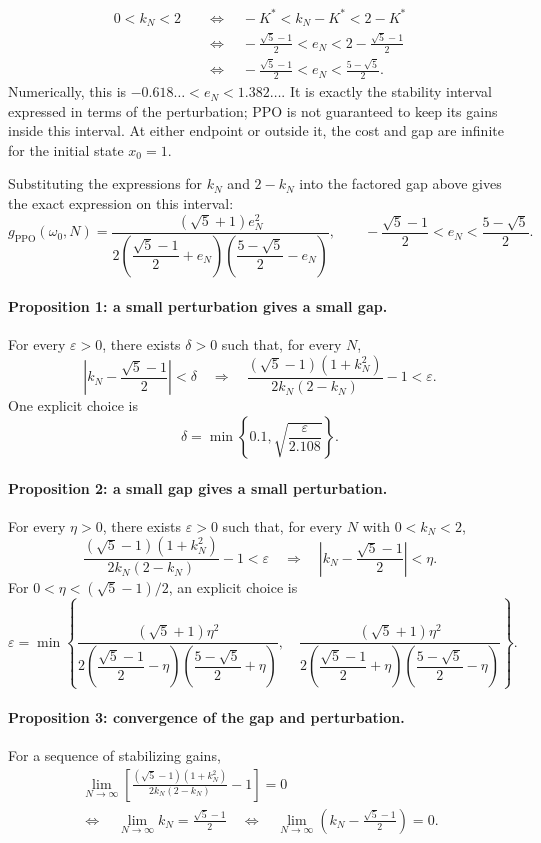 \documentclass[11pt]{article}
\begin{document}
\begin{align*}
  0<k_N<2
  &\quad\Longleftrightarrow\quad -K^*<k_N-K^*<2-K^* \\
  &\quad\Longleftrightarrow\quad
    -\frac{\sqrt{5}-1}{2}<e_N<2-\frac{\sqrt{5}-1}{2} \\
  &\quad\Longleftrightarrow\quad
    -\frac{\sqrt{5}-1}{2}<e_N<\frac{5-\sqrt{5}}{2}.
\end{align*}
Numerically, this is $-0.618\ldots<e_N<1.382\ldots$. It is exactly the stability
interval expressed in terms of the perturbation; PPO is not guaranteed to keep
its gains inside this interval. At either endpoint or outside it, the cost and
gap are infinite for the initial state $x_0=1$.

Substituting the expressions for $k_N$ and $2-k_N$ into the factored gap above
gives the exact expression on this interval:
\[
  g_{\mathrm{PPO}}(\omega_0,N)
  = \frac{(\sqrt{5}+1)e_N^2}
    {2\left(\dfrac{\sqrt{5}-1}{2}+e_N\right)
       \left(\dfrac{5-\sqrt{5}}{2}-e_N\right)},
  \qquad
  -\frac{\sqrt{5}-1}{2}<e_N<\frac{5-\sqrt{5}}{2}.
\]

\paragraph{Proposition 1: a small perturbation gives a small gap.}
For every $\varepsilon>0$, there exists $\delta>0$ such that, for every $N$,
\[
  \left|k_N-\frac{\sqrt{5}-1}{2}\right|<\delta
  \quad\Longrightarrow\quad
  \frac{(\sqrt{5}-1)(1+k_N^2)}{2k_N(2-k_N)}-1<\varepsilon .
\]
One explicit choice is
\[
  \delta=\min\left\{0.1,\sqrt{\frac{\varepsilon}{2.108}}\right\}.
\]

\paragraph{Proposition 2: a small gap gives a small perturbation.}
For every $\eta>0$, there exists $\varepsilon>0$ such that, for every $N$
with $0<k_N<2$,
\[
  \frac{(\sqrt{5}-1)(1+k_N^2)}{2k_N(2-k_N)}-1<\varepsilon
  \quad\Longrightarrow\quad
  \left|k_N-\frac{\sqrt{5}-1}{2}\right|<\eta .
\]
For $0<\eta<(\sqrt{5}-1)/2$, an explicit choice is
\[
  \varepsilon=\min\left\{
  \frac{(\sqrt{5}+1)\eta^2}
       {2\left(\dfrac{\sqrt{5}-1}{2}-\eta\right)
          \left(\dfrac{5-\sqrt{5}}{2}+\eta\right)},\quad
  \frac{(\sqrt{5}+1)\eta^2}
       {2\left(\dfrac{\sqrt{5}-1}{2}+\eta\right)
          \left(\dfrac{5-\sqrt{5}}{2}-\eta\right)}
  \right\}.
\]

\paragraph{Proposition 3: convergence of the gap and perturbation.}
For a sequence of stabilizing gains,
\begin{gather*}
  \lim_{N\to\infty}
  \left[\frac{(\sqrt{5}-1)(1+k_N^2)}{2k_N(2-k_N)}-1\right]=0
  \\
  \Longleftrightarrow\quad
  \lim_{N\to\infty}k_N=\frac{\sqrt{5}-1}{2}
  \quad\Longleftrightarrow\quad
  \lim_{N\to\infty}\left(k_N-\frac{\sqrt{5}-1}{2}\right)=0 .
\end{gather*}
\end{document}
